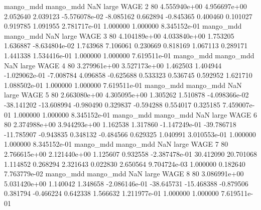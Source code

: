 mango_mdd mango_mdd                   NaN      large     WAGE                 2 80 4.555940e+00   4.956697e+00      2.052640       2.039123 -5.576078e-02     -8.085162      0.662894    -0.845365       0.400460  0.101027   0.919785     1.091955   2.781717e-01            1.000000        1.000000        8.345152e-01
mango_mdd mango_mdd                   NaN      large     WAGE                 3 80 4.104189e+00   4.033840e+00      1.753205       1.636887 -8.634804e-02      1.743968      7.106061     0.230669       0.818169  1.067113   0.289171     1.441338   1.534416e-01            1.000000        1.000000        7.619511e-01
mango_mdd mango_mdd                   NaN      large     WAGE                 4 80 3.279961e+00   3.527173e+00      1.462503       1.404944 -1.029062e-01     -7.008784      4.096858    -0.625688       0.533323  0.536745   0.592952     1.621710   1.088502e-01            1.000000        1.000000        7.619511e-01
mango_mdd mango_mdd                   NaN      large     WAGE                 5 80 2.663080e+00   4.305095e+00      1.305262       1.510878 -4.098366e-02    -38.141202    -13.608994    -0.980490       0.329837 -0.594288   0.554017     0.325185   7.459007e-01            1.000000        1.000000        8.345152e-01
mango_mdd mango_mdd                   NaN      large     WAGE                 6 80 2.374988e+00   3.944293e+00      1.162538       1.317860 -1.147249e-01    -39.786718    -11.785907    -0.943835       0.348132 -0.484566   0.629325     1.040991   3.010553e-01            1.000000        1.000000        8.345152e-01
mango_mdd mango_mdd                   NaN      large     WAGE                 7 80 2.766615e+00   2.121440e+00      1.125607       0.932558 -2.387478e-01     30.412090     20.701068     1.114852       0.268294  2.321643   0.022830     2.650564   9.704724e-03            1.000000        0.182640        7.763779e-02
mango_mdd mango_mdd                   NaN      large     WAGE                 8 80 3.086991e+00   5.031420e+00      1.140042       1.348658 -2.086146e-01    -38.645731    -15.468388    -0.879506       0.381794 -0.466224   0.642338     1.566632   1.211977e-01            1.000000        1.000000        7.619511e-01